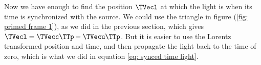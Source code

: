 \begin{derivation}

	Now we have enough to find the position $\TVecl $ at which the light is when its time is synchronized with the source.
	We could use the triangle in figure (\ref{fig: primed frame 1}), as we did in the previous section, which gives $\TVecl  = \TVecc  \TTp  -\TVecu  \TTp $.
	But it is easier to use the Lorentz transformed position and time, and then propagate the light back to the time of zero, which is what we did in equation \eqref{eq: synced time light}.


\end{derivation}
